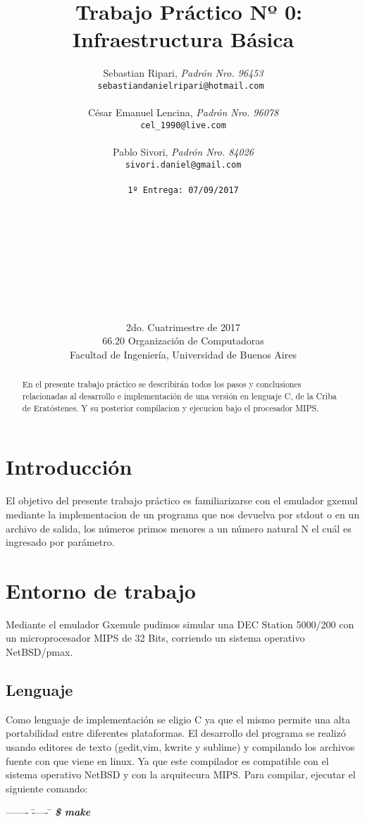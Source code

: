 \documentclass[a4paper,10pt]{article}
\title{	\ Trabajo Práctico Nº 0: Infraestructura Básica}
\author{	Sebastian Ripari, \textit{Padrón Nro. 96453}\\
            \texttt{sebastiandanielripari@hotmail.com }\\\\
            César Emanuel Lencina, \textit{Padrón Nro. 96078}\\
            \texttt{cel_1990@live.com}\\\\
			Pablo Sivori, \textit{Padrón Nro. 84026}\\
            \texttt{sivori.daniel@gmail.com}\\\\               
            \texttt{\footnotesize 1º Entrega: 07/09/2017}\\
            \\\\\\\\\\\\\\\\\\
            \normalsize{2do. Cuatrimestre de 2017}\\ 
            \normalsize{66.20 Organización de Computadoras} \\
            \normalsize{Facultad de Ingeniería, Universidad de Buenos Aires} \\}
\date{}
\begin{document}
\maketitle
\thispagestyle{empty}
\begin{abstract}
En el presente trabajo práctico se describirán todos los pasos y 
conclusiones relacionadas al desarrollo e implementación de una versión en lenguaje C,
de la Criba de Eratóstenes. Y su posterior compilacion y ejecucion bajo el procesador MIPS.
\end{abstract}
\newpage{}
\tableofcontents
\newpage{}

\begin{flushleft}

\par\end{flushleft}
\section{{\normalsize Introducción}}

El objetivo del presente trabajo práctico es familiarizarse con el emulador gxemul mediante la implementacion de un programa que nos devuelva por stdout o en un archivo de salida, los números primos menores a un número natural N el cuál es ingresado por parámetro.

\section{{\normalsize Entorno de trabajo}}
Mediante el emulador Gxemule pudimos simular una DEC Station 5000/200 con un microprocesador MIPS de 32 Bits, corriendo un sistema 
operativo NetBSD/pmax.

\subsection{{\normalsize Lenguaje}}

Como lenguaje de implementación se eligio C ya que el mismo permite una alta portabilidad entre 
diferentes plataformas. El desarrollo del programa se realizó usando editores de texto 
(gedit,vim, kwrite y sublime) y compilando los archivos fuente con 
 que viene en linux. Ya que este compilador es compatible
con el sistema operativo NetBSD y con la arquitecura MIPS.
Para compilar, ejecutar el siguiente comando:

\begin{tabbing}
------- \= ----- \= \kill
\> \textbf{\emph{\$ make}}\\ 
\end{tabbing}
\end{document}
